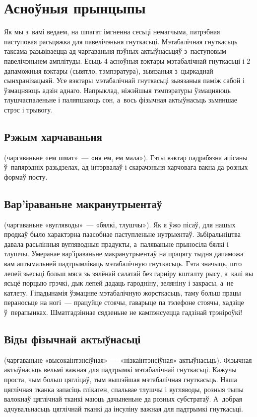 \section{Асноўныя прынцыпы}

Як мы з~вамі ведаем, на шпагат імгненна сесьці немагчыма, патрэбная паступовая расьцяжка для павелічэньня гнуткасьці. Мэтабалічная гнуткасьць таксама разьвіваецца ад чаргаваньня пэўных актыўнасьцяў з~паступовым павелічэньнем амплітуды. Ёсьць 4 асноўныя вэктары мэтабалічнай гнуткасьці і 2 дапаможныя вэктары (сьвятло, тэмпэратура), зьвязаныя з~цыркаднай сынхранізацыяй. Усе вэктары мэтабалічнай гнуткасьці зьвязаныя паміж сабой і ўзмацняюць адзін аднаго. Напрыклад, ніжэйшыя тэмпэратуры ўзмацняюць тлушчаспаленьне і паляпшаюць сон, а~вось фізычная актыўнасьць зьмяншае стрэс і трывогу.

\subsection{Рэжым харчаваньня} (чаргаваньне «ем шмат»~--- «ня ем, ем мала»).
Гэты вэктар падрабязна апісаны ў~папярэдніх разьдзелах, ад інтэрвалаў і скарачэньня харчовага вакна да розных формаў посту.

\subsection{Вар'іраваньне макранутрыентаў} (чаргаваньне «вугляводы»~--- «бялкі, тлушчы»).
Як я ўжо пісаў, для нашых продкаў было характэрна паасобнае паступленьне нутрыентаў. Зьбіральніцтва давала расьлінныя вугляводныя прадукты, а~паляваньне прыносіла бялкі і тлушчы. Умеранае вар'іраваньне макранутрыентаў на працягу тыдня дапаможа вам аптымальней падтрымліваць мэтабалічную гнуткасьць. Гэта значыць, што лепей зьесьці больш мяса зь зялёнай салатай без гарніру кшталту рысу, а~калі вы ясьцё порцыю грэчкі, дык лепей дадаць гародніну, зеляніну і закрасы, а~не катлету.
Гіпадынамія ўзмацняе мэтабалічную жорсткасьць, таму больш працы пераносьце на ногі~--- працуйце стоячы, гаварыце па тэлефоне стоячы, хадзіце ў~перапынках. Шматгадзіннае сядзеньне не кампэнсуецца гадзінай трэніроўкі!

\subsection{Віды фізычнай актыўнасьці} (чаргаваньне «высокаінтэнсіўная»~--- «нізкаінтэнсіўная» актыўнасьць).
Фізычная актыўнасьць вельмі важная для падтрымкі мэтабалічнай гнуткасьці. Кажучы проста, чым больш цягліцаў, тым вышэйшая мэтабалічная гнуткасьць. Наша цяглічная тканка запасіць глікаген, спальвае тлушчы і вугляводы, розныя тыпы валокнаў цяглічнай тканкі маюць дачыненьне да розных субстратаў. А~добрая адчувальнасьць цяглічнай тканкі да інсуліну важная для падтрымкі гнуткасьці.

